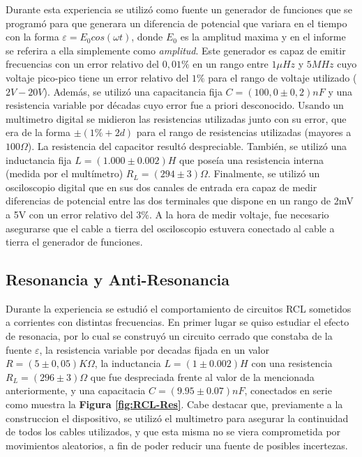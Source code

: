 \documentclass[11pt,a4paper]{article}
\begin{document}
Durante esta experiencia se utilizó como fuente un generador de funciones que se programó para que generara un diferencia de potencial que variara en el tiempo con la forma $\varepsilon = E_{0}cos(\omega t)$, donde $E_{0}$ es la amplitud maxima y en el informe se referira a ella simplemente como \textit{amplitud}. Este generador es capaz de emitir frecuencias con un error relativo del $0,01\%$ en un rango entre $1\mu Hz$ y $5MHz$ cuyo voltaje pico-pico tiene un error relativo del $1\%$ para el rango de voltaje utilizado ($2V-20V$). Además, se utilizó una capacitancia fija $C = (100,0 \pm 0,2)nF$ y una resistencia variable por décadas cuyo error fue a priori desconocido. Usando un multimetro digital se midieron las resistencias utilizadas junto con su error, que era de la forma $\pm(1\%+2d)$ para el rango de resistencias utilizadas (mayores a $100\Omega$). La resistencia del capacitor resultó despreciable. También, se utilizó una inductancia fija $L = (1.000 \pm 0.002) H$ que poseía una resistencia interna (medida por el multímetro) $R_L = (294 \pm 3) \Omega$.
Finalmente, se utilizó un osciloscopio digital que en sus dos canales de entrada era capaz de medir diferencias de potencial entre las dos terminales que dispone en un rango de 2mV a 5V con un error relativo del $3\%$. A la hora de medir voltaje, fue necesario asegurarse que el cable a tierra del osciloscopio estuvera conectado al cable a tierra el generador de funciones. 



\subsection{Resonancia y Anti-Resonancia}
Durante la experiencia se estudió el comportamiento de circuitos RCL sometidos a corrientes con distintas frecuencias. En primer lugar se quiso estudiar el efecto de resonacia, por lo cual se construyó un circuito cerrado que constaba de la fuente $\varepsilon$, la resistencia variable por decadas fijada en un valor $R = (5 \pm 0,05)K\Omega$, la inductancia $L = (1 \pm 0.002)H$ con una resistencia $R_{L}= (296\pm 3)\Omega$ que fue despreciada frente al valor de la mencionada anteriormente, y una capacitacia $C = (9.95 \pm 0.07)nF$, conectados en serie como muestra la \textbf{Figura \ref{fig:RCL-Res}}. Cabe destacar que, previamente a la construccion el dispositivo,  se utilizó el multimetro para asegurar la continuidad de todos los cables utilizados, y que esta misma no se viera comprometida por movimientos aleatorios, a fin de poder reducir una fuente de posibles incertezas.
\end{document}

